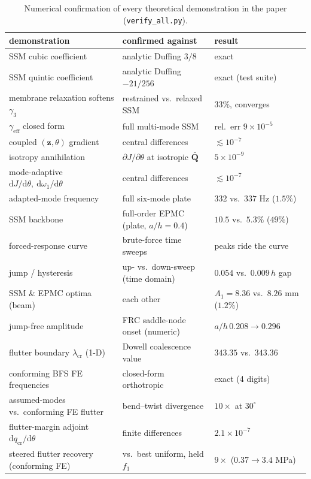 \documentclass[11pt]{article}
\newcommand{\dd}{\mathrm{d}}
\begin{document}
\begin{table}[t]
\centering\footnotesize
\caption{Numerical confirmation of every theoretical demonstration in the paper
(\texttt{verify\_all.py}).}
\label{tab:verifyall}
\begin{tabular}{@{}lll@{}}
\toprule
demonstration & confirmed against & result\\ \midrule
SSM cubic coefficient & analytic Duffing $3/8$ & exact\\
SSM quintic coefficient & analytic Duffing $-21/256$ & exact (test suite)\\
membrane relaxation softens $\gamma_3$ & restrained vs.\ relaxed SSM & $33\%$, converges\\
$\gamma_{\mathrm{eff}}$ closed form & full multi-mode SSM & rel.\ err $9\times10^{-5}$\\
coupled $(\bm z,\theta)$ gradient & central differences & $\lesssim\!10^{-7}$\\
isotropy annihilation & $\partial J/\partial\theta$ at isotropic $\bar{\bm Q}$ & $5\times10^{-9}$\\
mode-adaptive $\dd J/\dd\theta,\ \dd\omega_1/\dd\theta$ & central differences & $\lesssim\!10^{-7}$\\
adapted-mode frequency & full six-mode plate & $332$ vs.\ $337$ Hz ($1.5\%$)\\
SSM backbone & full-order EPMC (plate, $a/h\!=\!0.4$) & $10.5$ vs.\ $5.3\%$ ($49\%$)\\
forced-response curve & brute-force time sweeps & peaks ride the curve\\
jump / hysteresis & up- vs.\ down-sweep (time domain) & $0.054$ vs.\ $0.009\,h$ gap\\
SSM \& EPMC optima (beam) & each other & $A_1=8.36$ vs.\ $8.26$ mm ($1.2\%$)\\
jump-free amplitude & FRC saddle-node onset (numeric) & $a/h\,0.208\!\to\!0.296$\\
flutter boundary $\lambda_{\mathrm{cr}}$ (1-D) & Dowell coalescence value & $343.35$ vs.\ $343.36$\\
conforming BFS FE frequencies & closed-form orthotropic & exact (4 digits)\\
assumed-modes vs.\ conforming FE flutter & bend--twist divergence & $10\times$ at $30^\circ$\\
flutter-margin adjoint $\dd q_{\mathrm{cr}}/\dd\theta$ & finite differences & $2.1\times10^{-7}$\\
steered flutter recovery (conforming FE) & vs.\ best uniform, held $f_1$ & $9\times$ ($0.37\!\to\!3.4$ MPa)\\
\bottomrule
\end{tabular}
\end{table}
\end{document}

